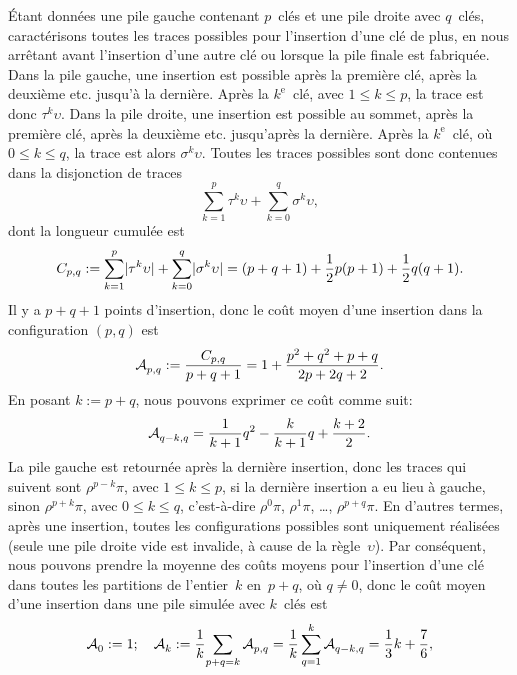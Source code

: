 Étant données une pile gauche contenant \(p\)~clés et une pile droite
avec \(q\)~clés, caractérisons toutes les traces possibles pour
l'insertion d'une clé de plus, en nous arrêtant avant l'insertion
d'une autre clé ou lorsque la pile finale est fabriquée. Dans la pile
gauche, une insertion est possible après la première clé, après la
deuxième etc. jusqu'à la dernière. Après la \(k^\text{e}\)~clé, avec
\(1 \leqslant k \leqslant p\), la trace est donc
\(\tau^k\upsilon\). Dans la pile droite, une insertion est possible au
sommet, après la première clé, après la deuxième etc. jusqu'après la
dernière. Après la \(k^\text{e}\)~clé, où \(0 \leqslant k \leqslant
q\), la trace est alors \(\sigma^k\upsilon\). Toutes les traces
possibles sont donc contenues dans la disjonction de traces
\begin{equation*}
\sum_{k=1}^{p}{\tau^k\upsilon} + \sum_{k=0}^{q}{\sigma^k\upsilon},
\end{equation*}
dont la longueur cumulée est
\begin{equation*}
C_{p,q} := \sum_{k=1}^{p}\lvert{\tau^k\upsilon}\rvert{} +
\sum_{k=0}^{q}\lvert{\sigma^k\upsilon}\rvert{}
= (p+q+1) + \frac{1}{2}p(p+1) + \frac{1}{2}q(q+1).
\end{equation*}
Il y a \(p+q+1\) points d'insertion, donc le coût moyen d'une
insertion dans la configuration \((p,q)\) est
\begin{equation}
\mathcal{A}_{p,q}^{} := \frac{C_{p,q}}{p+q+1}
           = 1 + \frac{p^2 + q^2 + p + q}{2p + 2q + 2}.
\label{eq:Mpq}
\end{equation}
En posant \(k := p + q\), nous pouvons exprimer ce coût comme suit:
\begin{equation*}
\mathcal{A}_{q-k,q}^{} = \frac{1}{k+1}{q^2} - \frac{k}{k+1}{q} + \frac{k+2}{2}.
\end{equation*}
La pile gauche est retournée après la dernière insertion, donc les
traces qui suivent sont \(\rho^{p-k}\pi\), avec \(1 \leqslant k
\leqslant p\), si la dernière insertion a eu lieu à gauche, sinon
\(\rho^{p+k}\pi\), avec \(0 \leqslant k \leqslant q\), c'est-à-dire
\(\rho^0\pi\), \(\rho^1\pi\), \ldots, \(\rho^{p+q}\pi\). En d'autres
termes, après une insertion, toutes les configurations possibles sont
uniquement réalisées (seule une pile droite vide est invalide, à cause
de la règle~\(\upsilon\)). Par conséquent, nous pouvons prendre la
moyenne des coûts moyens pour l'insertion d'une clé dans toutes les
partitions de l'entier~\(k\) en~\(p + q\), où \(q \neq 0\), donc le
coût moyen d'une insertion dans une pile simulée avec \(k\)~clés est
\begin{equation*}
\mathcal{A}_{0}^{} := 1;\quad
\mathcal{A}_{k}^{} := \frac{1}{k}\!\sum_{p+q=k}\mathcal{A}_{p,q}^{}
         = \frac{1}{k}\sum_{q=1}^{k}\mathcal{A}_{q-k,q}^{}
         = \frac{1}{3}k + \frac{7}{6},
\end{equation*}
